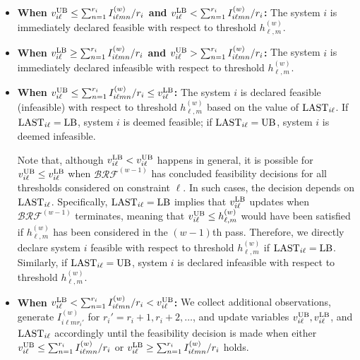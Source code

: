 \documentclass[11pt]{article}
\begin{document}
\begin{itemize}
    \item {\bf When $v_{i\ell}^{\rm UB}\leq \sum_{n=1}^{r_i} I_{i\ell mn}^{(w)}/r_i$ and $v_{i\ell}^{\rm LB}<\sum_{n=1}^{r_i} I_{i\ell mn}^{(w)}/r_i$:} The system $i$ is immediately declared feasible with respect to threshold $h_{\ell,m}^{(w)}$.
    \item {\bf When $v_{i\ell}^{\rm LB} \geq \sum_{n=1}^{r_i} I_{i\ell mn}^{(w)}/r_i$ and $v_{i\ell}^{\rm UB}>\sum_{n=1}^{r_i} I_{i\ell mn}^{(w)}/r_i$:} The system $i$ is immediately declared infeasible with respect to threshold $h_{\ell,m}^{(w)}$.
    \item {\bf When $v_{i\ell}^{\rm UB}\leq \sum_{n=1}^{r_i} I_{i\ell mn}^{(w)}/r_i\leq v_{i\ell}^{\rm LB}$:} The system $i$ is declared feasible (infeasible) with respect to threshold $h_{\ell,m}^{(w)}$ based on the value of ${\rm LAST}_{i\ell}$. If ${\rm LAST}_{i\ell}={\rm LB}$, system $i$ is deemed feasible; if ${\rm LAST}_{i\ell}={\rm UB}$, system $i$ is deemed infeasible. 

    Note that, although $v_{i\ell}^{\rm LB}<v_{i\ell}^{\rm UB}$ happens in general, it is possible for $v_{i\ell}^{\rm UB}\leq v_{i\ell}^{\rm LB}$ when $\mathcal{BRF}^{(w-1)}$ has concluded feasibility decisions for all thresholds considered on constraint $\ell$. In such cases, the decision depends on ${\rm LAST}_{i\ell}$. Specifically, ${\rm LAST}_{i\ell}={\rm LB}$ implies that $v_{i\ell}^{\rm LB}$ updates when $\mathcal{BRF}^{(w-1)}$ terminates, meaning that $v_{i\ell}^{\rm UB}\leq h_{\ell,m}^{(w)}$ would have been satisfied if $h_{\ell,m}^{(w)}$ has been considered in the $(w-1)$th pass. Therefore, we directly declare system $i$ feasible with respect to threshold $h_{\ell,m}^{(w)}$ if ${\rm LAST}_{i\ell}={\rm LB}$.
    Similarly, if ${\rm LAST}_{i\ell}={\rm UB}$, system $i$ is declared infeasible with respect to threshold $h_{\ell,m}^{(w)}$.  
    \item {\bf When $v_{i\ell}^{\rm LB}< \sum_{n=1}^{r_i} I_{i\ell mn}^{(w)}/r_i < v_{i\ell}^{\rm UB}$:} We collect additional observations, generate $I_{i\ell m r_i'}^{(w)}$ for $r_i'=r_i+1,r_i+2,\ldots$, and update variables $v_{i\ell}^{\rm UB}, v_{i\ell}^{\rm LB}$, and ${\rm LAST}_{i\ell}$ accordingly until the feasibility decision is made when either $v_{i\ell}^{\rm UB}\leq \sum_{n=1}^{r_i} I_{i\ell mn}^{(w)}/r_i$ or $v_{i\ell}^{\rm LB}\geq \sum_{n=1}^{r_i} I_{i\ell mn}^{(w)}/r_i$ holds. 
\end{itemize}
\end{document}
